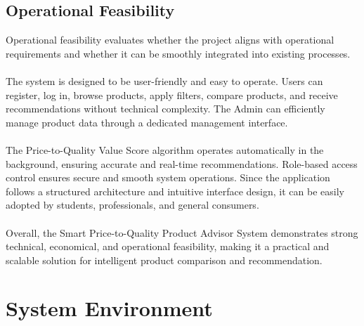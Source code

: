  \subsection{Operational Feasibility}
  Operational feasibility evaluates whether the project aligns with operational requirements and whether it can be smoothly integrated into existing processes.\\\\
 The system is designed to be user-friendly and easy to operate. Users can register, log in, browse products, apply filters, compare products, and receive recommendations without technical complexity. The Admin can efficiently manage product data through a dedicated management interface.\\\\
\noindent
The Price-to-Quality Value Score algorithm operates automatically in the background, ensuring accurate and real-time recommendations. Role-based access control ensures secure and smooth system operations. Since the application follows a structured architecture and intuitive interface design, it can be easily adopted by students, professionals, and general consumers.\\\\
\noindent
Overall, the Smart Price-to-Quality Product Advisor System demonstrates strong technical, economical, and operational feasibility, making it a practical and scalable solution for intelligent product comparison and recommendation.
 \section{System Environment}
 
